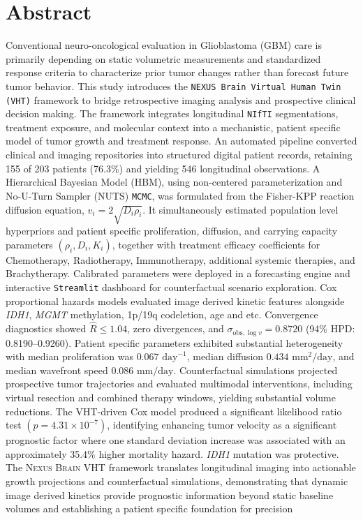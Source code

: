 \pagebreak
    \hspace{0pt}
    \vfill
    \section*{Abstract}
    
    Conventional neuro-oncological evaluation in Glioblastoma (GBM) care is primarily depending on static volumetric measurements and standardized response criteria to characterize prior tumor changes rather than forecast future tumor behavior. This study introduces the \texttt{NEXUS Brain Virtual Human Twin (VHT)} framework to bridge retrospective imaging analysis and prospective clinical decision making. The framework integrates longitudinal \texttt{NIfTI} segmentations, treatment exposure, and molecular context into a mechanistic, patient specific model of tumor growth and treatment response. An automated pipeline converted clinical and imaging repositories into structured digital patient records, retaining 155 of 203 patients (76.3\%) and yielding 546 longitudinal observations. A Hierarchical Bayesian Model (HBM), using non-centered parameterization and No-U-Turn Sampler (NUTS) \texttt{MCMC}, was formulated from the Fisher-KPP reaction diffusion equation, \(v_i=2\sqrt{D_i\rho_i}\). It simultaneously estimated population level hyperpriors and patient specific proliferation, diffusion, and carrying capacity parameters \((\rho_i,D_i,K_i)\), together with treatment efficacy coefficients for Chemotherapy, Radiotherapy, Immunotherapy, additional systemic therapies, and Brachytherapy. Calibrated parameters were deployed in a forecasting engine and interactive \texttt{Streamlit} dashboard for counterfactual scenario exploration. Cox proportional hazards models evaluated image derived kinetic features alongside \textit{IDH1}, \textit{MGMT} methylation, 1p/19q codeletion, age and etc. Convergence diagnostics showed \(\widehat{R}\leq1.04\), zero divergences, and \(\sigma_{\mathrm{obs},\log v}=0.8720\) (94\% HPD: 0.8190--0.9260). Patient specific parameters exhibited substantial heterogeneity with median proliferation was \(0.067\text{ day}^{-1}\), median diffusion \(0.434\text{ mm}^2/\text{day}\), and median wavefront speed \(0.086\text{ mm/day}\). Counterfactual simulations projected prospective tumor trajectories and evaluated multimodal interventions, including virtual resection and combined therapy windows, yielding substantial volume reductions. The VHT-driven Cox model produced a significant likelihood ratio test \((p=4.31\times10^{-7})\), identifying enhancing tumor velocity as a significant prognostic factor where one standard deviation increase was associated with an approximately 35.4\% higher mortality hazard. \textit{IDH1} mutation was protective. The \textsc{Nexus Brain} VHT framework translates longitudinal imaging into actionable growth projections and counterfactual simulations, demonstrating that dynamic image derived kinetics provide prognostic information beyond static baseline volumes and establishing a patient specific foundation for precision
    
    \vfill
    \hspace{0pt}
\pagebreak